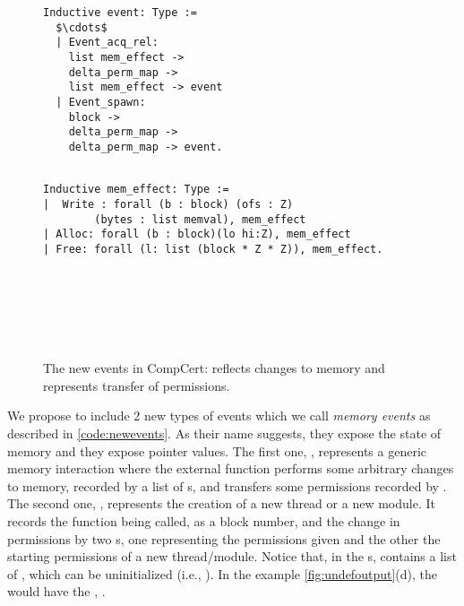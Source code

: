 \begin{figure}\centering
\begin{multicols}{2}
\begin{lstlisting}
Inductive event: Type :=
  $\cdots$
  | Event_acq_rel: 
  	list mem_effect -> 
	delta_perm_map -> 
	list mem_effect -> event
  | Event_spawn: 
  	block -> 
  	delta_perm_map -> 
  	delta_perm_map -> event.
	
  \end{lstlisting}

	
  \begin{lstlisting}
Inductive mem_effect: Type :=
|  Write : forall (b : block) (ofs : Z)
		(bytes : list memval), mem_effect
| Alloc: forall (b : block)(lo hi:Z), mem_effect
| Free: forall (l: list (block * Z * Z)), mem_effect.
  \end{lstlisting}
  
  \
	
	\
	
	\
	
\end{multicols}
\caption[New events in CompCert]{The new events in CompCert:   reflects changes to memory and  represents transfer of  permissions.}\label{code:newevents}
\end{figure}

We propose to include 2 new types of events which we call \emph{memory events} as described in \autoref{code:newevents}. As their name suggests, they expose the state of memory and they expose pointer values.  
The first one, , represents a generic memory interaction where the external function performs some arbitrary changes to memory, recorded by a list of s, and transfers some permissions recorded by . %
The second one,  , represents the creation of a new thread or a new module. It records the function being called, as a block number, and the change in permissions by two s, one representing the permissions given and the other the starting permissions of a new thread/module. Notice that, in the s,  contains a list of , which can be uninitialized (i.e., ).   In the example \autoref{fig:undefoutput}(d), the  would have the , .

